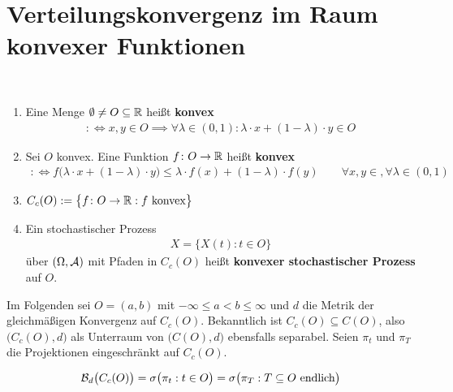 
\section{Verteilungskonvergenz im Raum konvexer Funktionen} %

\begin{definition}\label{def9.1}\
	\begin{enumerate}[label=(\arabic*)]
		\item Eine Menge $\emptyset\neq O\subseteq\mathbb{R}$ heißt \textbf{konvex}
		\begin{align*}
			:\Longleftrightarrow x,y\in O\implies\forall\lambda\in(0,1):\lambda\cdot x+(1-\lambda)\cdot y\in O
		\end{align*}
		\item Sei $O$ konvex. Eine Funktion $f\colon O\to\mathbb{R}$ heißt \textbf{konvex}
		\begin{align*}
			:\Longleftrightarrow 
			f\big(\lambda\cdot x+(1-\lambda)\cdot y\big)\leq\lambda\cdot f(x)+(1-\lambda)\cdot f(y)\qquad\forall x,y\in,\forall\lambda\in(0,1)
		\end{align*}
		\item $\begin{aligned}
			C_c(O):=\big\lbrace f\colon O\to\mathbb{R}:f\text{ konvex}\big\rbrace
		\end{aligned}$
		\item Ein stochastischer Prozess
		\begin{align*}
			X=\big\lbrace X(t):t\in O\big\rbrace
		\end{align*}				
		über $(\Omega,\mathcal{A})$ mit Pfaden in $C_c(O)$ heißt \textbf{konvexer stochastischer Prozess} auf $O$.
	\end{enumerate}
\end{definition}

Im Folgenden sei $O=(a,b)$ mit $-\infty\leq a<b\leq\infty$ und $d$ die Metrik der gleichmäßigen Konvergenz auf $C_c(O)$.
Bekanntlich ist $C_c(O)\subseteq C(O)$, also $\big(C_c(O),d\big)$ als Unterraum von $\big(C(O),d\big)$ ebensfalls separabel.
Seien $\pi_t$ und $\pi_T$ die Projektionen eingeschränkt auf $C_c(O)$.

\begin{satz}\label{satz9.2}
	\begin{align*}
		\mathcal{B}_d\big(C_c(O)\big)=\sigma\big(\pi_t:t\in O\big)=\sigma\big(\pi_T:T\subseteq O\text{ endlich}\big)
	\end{align*}
\end{satz}


